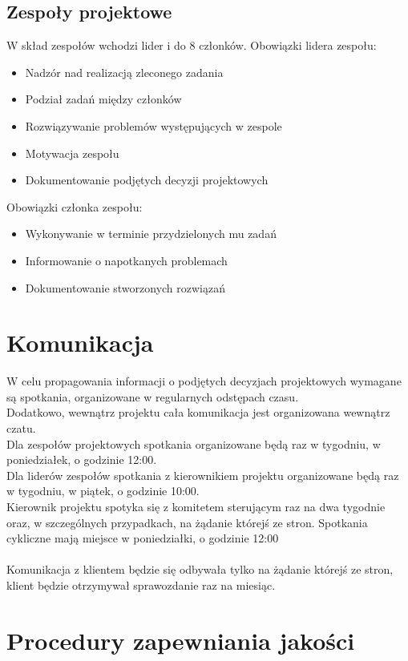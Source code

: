 \documentclass[12pt]{article}
\begin{document}
\subsection{Zespoły projektowe}
W skład zespołów wchodzi lider i do 8 członków.
Obowiązki lidera zespołu:
\begin{itemize}
\item Nadzór nad realizacją zleconego zadania
\item Podział zadań między członków
\item Rozwiązywanie problemów występujących w zespole
\item Motywacja zespołu
\item Dokumentowanie podjętych decyzji projektowych
\end{itemize}
Obowiązki członka zespołu:
\begin{itemize}
\item Wykonywanie w terminie przydzielonych mu zadań
\item Informowanie o napotkanych problemach
\item Dokumentowanie stworzonych rozwiązań
\end{itemize}

\newpage
\section{Komunikacja}
W celu propagowania informacji o podjętych decyzjach projektowych wymagane są spotkania, organizowane w regularnych odstępach czasu.\\
Dodatkowo, wewnątrz projektu cała komunikacja jest organizowana wewnątrz czatu.\\
Dla zespołów projektowych spotkania organizowane będą raz w tygodniu, w poniedziałek, o godzinie 12:00.\\
Dla liderów zespołów spotkania z kierownikiem projektu organizowane będą raz w tygodniu, w piątek, o godzinie 10:00.\\
Kierownik projektu spotyka się z komitetem sterującym raz na dwa tygodnie oraz, w szczególnych przypadkach, na żądanie którejś ze stron. Spotkania cykliczne mają miejsce w poniedziałki, o godzinie 12:00\\\\
Komunikacja z klientem będzie się odbywała tylko na żądanie którejś ze stron, klient będzie otrzymywał sprawozdanie raz na miesiąc.\\

\newpage
\section{Procedury zapewniania jakości}
\end{document}
